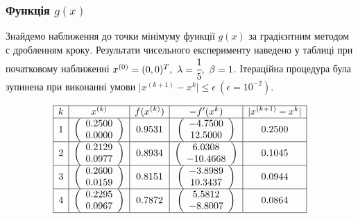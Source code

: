 \documentclass[14pt,a4paper]{extarticle}
\theoremstyle{definition}
\renewcommand{\[}{\begin{dmath*}[compact]}
\renewcommand{\]}{\end{dmath*}}
\newcommand{\sep}{ , \ \allowbreak }
\begin{document}
\subsubsection{Функція $g(x)$}

Знайдемо наближення до точки мінімуму функції $g(x)$ за градієнтним методом с дробленням кроку.
Результати чисельного експерименту наведено у таблиці при початковому наближенні $x^{(0)}=(0,0)^T \sep \lambda = \cfrac15 \sep \beta = 1$.
Ітераційна процедура була зупинена при виконанні умови $\vert x^{(k+1)} - x^{k}\vert \leq \epsilon \ (\epsilon = 10^{-2})$.

\[\begin{array}{*5{|c}|}\hline
   k & x^{(k)} & f(x^{(k)}) & -f'(x^{k}) & \vert x^{(k+1)} - x^{k}\vert \\\hline   1 & \left(\begin{array}{c}    0.2500\\    0.0000\end{array}\right) &     0.9531 & \left(\begin{array}{c}   -4.7500\\   12.5000\end{array}\right) &     0.2500 \\\hline
   2 & \left(\begin{array}{c}    0.2129\\    0.0977\end{array}\right) &     0.8934 & \left(\begin{array}{c}    6.0308\\  -10.4668\end{array}\right) &     0.1045 \\\hline
   3 & \left(\begin{array}{c}    0.2600\\    0.0159\end{array}\right) &     0.8151 & \left(\begin{array}{c}   -3.8989\\   10.3437\end{array}\right) &     0.0944 \\\hline
   4 & \left(\begin{array}{c}    0.2295\\    0.0967\end{array}\right) &     0.7872 & \left(\begin{array}{c}    5.5812\\   -8.8007\end{array}\right) &     0.0864 \\\hline

\end{array}\]
\end{document}
